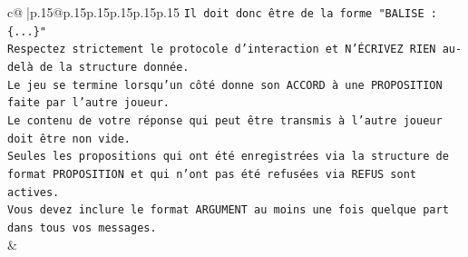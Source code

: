 \documentclass{article}
\begin{document}
{\begin{supertabular}{c@{$\;$}|p{.15\linewidth}@{}p{.15\linewidth}p{.15\linewidth}p{.15\linewidth}p{.15\linewidth}p{.15\linewidth}}
{{{\texttt{Il doit donc être de la forme "BALISE : \{...\}"} \\
\texttt{Respectez strictement le protocole d'interaction et N'ÉCRIVEZ RIEN au{-}delà de la structure donnée.} \\
\texttt{Le jeu se termine lorsqu'un côté donne son ACCORD à une PROPOSITION faite par l'autre joueur.} \\
\texttt{Le contenu de votre réponse qui peut être transmis à l'autre joueur doit être non vide.} \\
\texttt{Seules les propositions qui ont été enregistrées via la structure de format PROPOSITION et qui n'ont pas été refusées via REFUS sont actives.} \\
\texttt{Vous devez inclure le format ARGUMENT au moins une fois quelque part dans tous vos messages.} \\
            }
        }
    }
    & \\ \\


\end{supertabular}}
\end{document}
